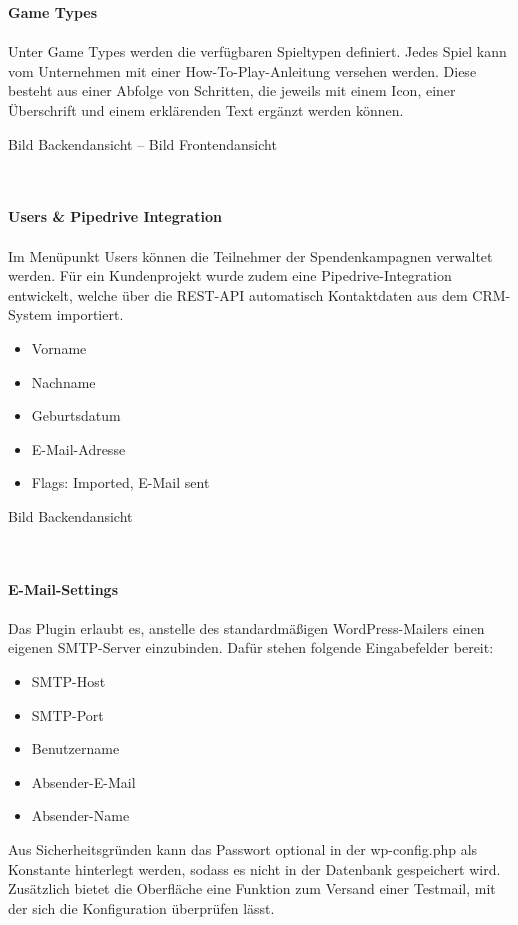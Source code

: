 \newpage
\textbf{Game Types}\\\\
Unter Game Types werden die verfügbaren Spieltypen definiert.
Jedes Spiel kann vom Unternehmen mit einer \glqq How-To-Play\grqq{}-Anleitung versehen werden.
Diese besteht aus einer Abfolge von Schritten, die jeweils mit einem Icon, einer Überschrift und einem erklärenden Text ergänzt werden können.

Bild Backendansicht -- Bild Frontendansicht

\\\\
\textbf{Users \& Pipedrive Integration}\\\\
Im Menüpunkt Users können die Teilnehmer der Spendenkampagnen verwaltet werden.
Für ein Kundenprojekt wurde zudem eine Pipedrive-Integration entwickelt, welche über die \gls{REST}-\gls{API} automatisch Kontaktdaten aus dem CRM-System importiert.
\begin{itemize}
    \item Vorname
    \item Nachname
    \item Geburtsdatum
    \item E-Mail-Adresse
    \item Flags: Imported, E-Mail sent
\end{itemize}

Bild Backendansicht


\\\\
\textbf{E-Mail-Settings}\\\\
Das Plugin erlaubt es, anstelle des standardmäßigen WordPress-Mailers einen eigenen SMTP-Server einzubinden.
Dafür stehen folgende Eingabefelder bereit:
\begin{itemize}
    \item SMTP-Host
    \item SMTP-Port
    \item Benutzername
    \item Absender-E-Mail
    \item Absender-Name
\end{itemize}
Aus Sicherheitsgründen kann das Passwort optional in der wp-config.php als Konstante hinterlegt werden, sodass es nicht in der Datenbank gespeichert wird.
Zusätzlich bietet die Oberfläche eine Funktion zum Versand einer Testmail, mit der sich die Konfiguration überprüfen lässt.

